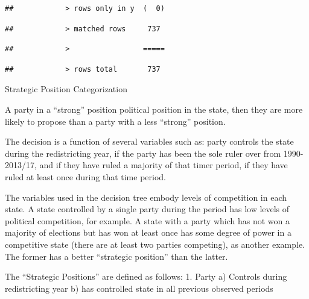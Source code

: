 \documentclass[]{article}
\begin{document}
\begin{verbatim}
##            > rows only in y  (  0)
\end{verbatim}

\begin{verbatim}
##            > matched rows     737
\end{verbatim}

\begin{verbatim}
##            >                 =====
\end{verbatim}

\begin{verbatim}
##            > rows total       737
\end{verbatim}

Strategic Position Categorization

A party in a ``strong'' position political position in the state, then
they are more likely to propose than a party with a less ``strong''
position.

The decision is a function of several variables such as: party controls
the state during the redistricting year, if the party has been the sole
ruler over from 1990-2013/17, and if they have ruled a majority of that
timer period, if they have ruled at least once during that time period.

The variables used in the decision tree embody levels of competition in
each state. A state controlled by a single party during the period has
low levels of political competition, for example. A state with a party
which has not won a majority of elections but has won at least once has
some degree of power in a competitive state (there are at least two
parties competing), as another example. The former has a better
``strategic position'' than the latter.

The ``Strategic Positions'' are defined as follows: 1. Party a) Controls
during redistricting year b) has controlled state in all previous
observed periods
\end{document}
